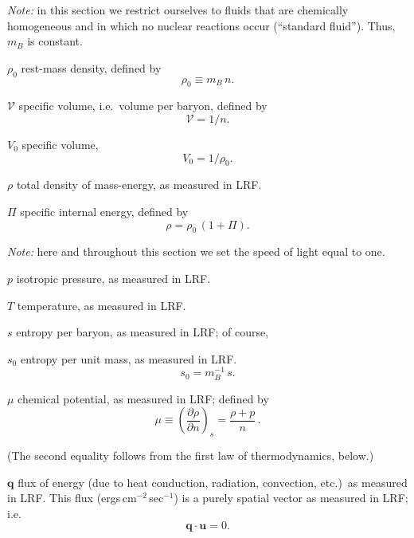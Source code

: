 \emph{Note:} in this section we restrict ourselves to fluids that are
chemically homogeneous and in which no nuclear reactions occur
(``standard fluid'').  Thus, $m_B$ is constant.

\medskip
\noindent
$\rho_0$ \quad rest-mass density, defined by
%
\begin{equation}
\tag{2.5.2}
\rho_0 \equiv m_B\, n.
\end{equation}

\noindent
$\mathcal{V}$ \quad specific volume, i.e.\ volume per baryon, defined by
%
\begin{equation}
\tag{2.5.3}
\mathcal{V} = 1/n.
\end{equation}

\noindent
$V_0$ \quad specific volume,
%
\begin{equation}
\tag{2.5.4}
V_0 = 1/\rho_0.
\end{equation}

\noindent
$\rho$ \quad total density of mass-energy, as measured in LRF.

\noindent
$\Pi$ \quad specific internal energy, defined by
%
\begin{equation}
\tag{2.5.5}
\rho = \rho_0\,(1 + \Pi).
\end{equation}

\noindent
\emph{Note:} here and throughout this section we set the speed of light
equal to one.

\medskip
\noindent
$p$ \quad isotropic pressure, as measured in LRF.

\noindent
$T$ \quad temperature, as measured in LRF.

\noindent
$s$ \quad entropy per baryon, as measured in LRF; of course,

\noindent
$s_0$ \quad entropy per unit mass, as measured in LRF.
%
\begin{equation}
\tag{2.5.6}
s_0 = m_B^{-1}\, s.
\end{equation}

\noindent
$\mu$ \quad chemical potential, as measured in LRF; defined by
%
\begin{equation}
\tag{2.5.7}
\mu \equiv \left(\frac{\partial\rho}{\partial n}\right)_{\!s}
  = \frac{\rho + p}{n}\,.
\end{equation}

(The second equality follows from the first law of thermodynamics,
below.)

\medskip
\noindent
$\mathbf{q}$ \quad flux of energy (due to heat conduction, radiation,
convection, etc.)\ as measured in LRF.  This flux
(ergs\,cm$^{-2}$\,sec$^{-1}$) is a purely spatial vector as measured
in LRF; i.e.
%
\begin{equation}
\tag{2.5.8}
\mathbf{q} \cdot \mathbf{u} = 0.
\end{equation}

